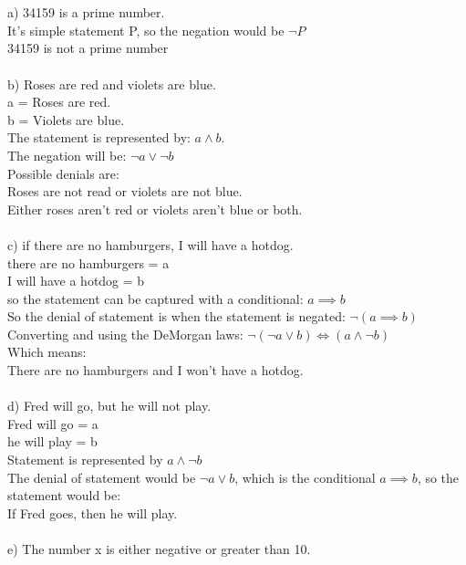 \documentclass{article}
\begin{document}
\section{}
a) 34159 is a prime number. \\
It's simple statement P, so the negation would be $\neg P$ \\
34159 is not a prime number \\
\\
b) Roses are red and violets are blue. \\
a = Roses are red. \\
b = Violets are blue. \\
The statement is represented by: $a \wedge b$.\\
The negation will be: $\neg a \vee \neg b$ \\
Possible denials are: \\
Roses are not read or violets are not blue. \\
Either roses aren't red or violets aren't blue or both. \\
\\
c) if there are no hamburgers, I will have a hotdog. \\
there are no hamburgers = a \\
I will have a hotdog = b \\
so the statement can be captured with a conditional: $a \implies b$\\
So the denial of statement is when the statement is negated: $\neg(a \implies b)$ \\
Converting and using the DeMorgan laws: $\neg(\neg a \vee b) \Leftrightarrow (a \wedge \neg b)$\\
Which means: \\
There are no hamburgers and I won't have a hotdog. \\
\\
d) Fred will go, but he will not play. \\
Fred will go = a \\
he will play = b \\
Statement is represented by $a \wedge \neg b$\\
The denial of statement would be $\neg a \vee b$, which is the conditional $a \implies b$, so the statement would be: \\
If Fred goes, then he will play. \\
\\
e) The number x is either negative  or greater than 10. \\
\end{document}
